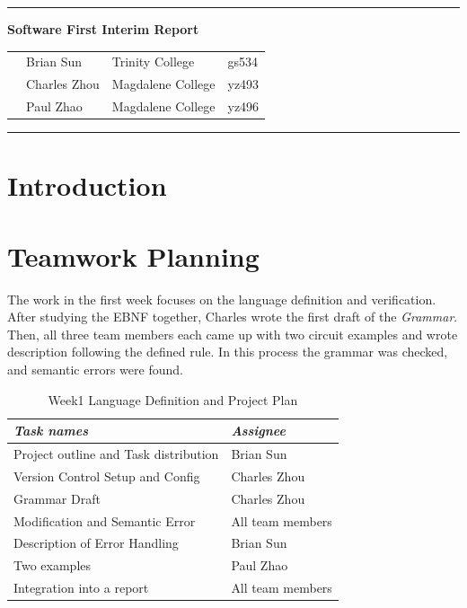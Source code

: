 \documentclass[12pt]{article}
\def\n{\noindent}
\begin{document}
\vspace{0.3cm}
\rule{15.7cm}{0.5mm}


\begin{center}
{\hspace{0.6cm}\Large \textbf {Software First Interim Report}\\
}
\end{center}
\begin{table}[H]
\centering
\begin{tabular}{ p{1.5cm}p{5cm}p{6cm} p{6cm}} 
&Brian Sun & Trinity College & gs534 \\ 
&Charles Zhou & Magdalene College & yz493 \\ 
&Paul Zhao & Magdalene College & yz496 \\ 
\end{tabular}
\end{table}


\begin{center}
\rule{15.7cm}{0.5mm}
\end{center}

\section{Introduction}
\section{Teamwork Planning}
\n The work in the first week focuses on the language definition and verification. After studying the EBNF together, Charles wrote the first draft of the \textit{Grammar}. Then, all three team members each came up with two circuit examples and wrote description following the defined rule. In this process the grammar was checked, and semantic errors were found. \\
\begin{table}[H]
\begin{tabular}{p{8cm}p{5cm}} 
\textit{Task names} & \textit{Assignee}\\
\hline
Project outline and Task distribution & Brian Sun\\
Version Control Setup and Config & Charles Zhou\\
Grammar Draft 	& Charles Zhou\\
Modification and Semantic Error & All team members\\
Description of Error Handling & Brian Sun\\
Two examples & Paul Zhao\\
Integration into a report & All team members\\
\end{tabular}
\caption{Week1 Language Definition and Project Plan}
\end{table}
\end{document}
